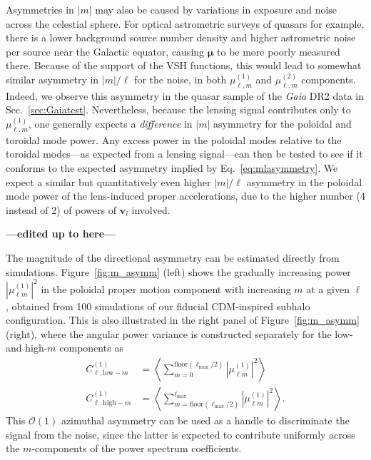 \documentclass[prd,aps,10pt,nofootinbib,twocolumn,superscriptaddress,preprintnumbers,balancelastpage,longbibliography]{revtex4-1}
\newcommand{\vect}[1]{\boldsymbol{\mathbf{#1}}}
\newcommand{\ellm}{{\ell m}}
\newcommand{\red}[1]{\textcolor{deepred}{\bf #1}}
\newcommand{\edit}{\red{---edited up to here---}}
\begin{document}
Asymmetries in $|m|$ may also be caused by variations in exposure and noise across the celestial sphere. For optical astrometric surveys of quasars for example, there is a lower background source number density and higher astrometric noise per source near the Galactic equator, causing $\vect{\mu}$ to be more poorly measured there. Because of the support of the VSH functions, this would lead to somewhat similar asymmetry in $|m|/\ell$ for the noise, in both $\mu_{\ell,m}^{(1)}$ and $\mu_{\ell,m}^{(2)}$ components. Indeed, we observe this asymmetry in the quasar sample of the \textit{Gaia} DR2 data in Sec.~\ref{sec:Gaiatest}. Nevertheless, because the lensing signal contributes only to $\mu_{\ell,m}^{(1)}$, one generally expects a \emph{difference} in $|m|$ asymmetry for the poloidal and toroidal mode power. Any excess power in the poloidal modes relative to the toroidal modes---as expected from a lensing signal---can then be tested to see if it conforms to the expected asymmetry implied by Eq.~\ref{eq:mlasymmetry}. We expect a similar but quantitatively even higher $|m|/\ell$ asymmetry in the poloidal mode power of the lens-induced proper accelerations, due to the higher number (4 instead of 2) of powers of $\vect{v}_l$ involved.

\edit



The magnitude of the directional asymmetry can be estimated directly from simulations. Figure~\ref{fig:m_asymm} (left) shows the gradually increasing power $|\mu^{(1)}_\ellm|^2$ in the poloidal proper motion component with increasing $m$ at a given $\ell$, obtained from 100 simulations of our fiducial CDM-inspired subhalo configuration. This is also illustrated in the right panel of Figure~\ref{fig:m_asymm} (right), where the angular power variance is constructed separately for the low- and high-$m$ components as 
\begin{align}
 C_{\ell,\mathrm{low-}m}^{(1)} &=  \left\langle \sum_{m = 0}^{\mathrm{floor}(\ell_\mathrm{max}/2)} \left| \mu_{\ell m}^{(1)} \right|^2\right\rangle \nonumber \\
 C_{\ell,\mathrm{high-}m}^{(1)} &= \left\langle\sum_{m = {\mathrm{floor}(\ell_\mathrm{max}/2)}}^{\ell_\mathrm{max}} \left| \mu_{\ell m}^{(1)} \right|^2\right\rangle. \label{eq:asymm}
\end{align}
This $\mathcal{O}(1)$ azimuthal asymmetry can be used as a handle to discriminate the signal from the noise, since the latter is expected to contribute uniformly across the $m$-components of the power spectrum coefficients.
\end{document}
